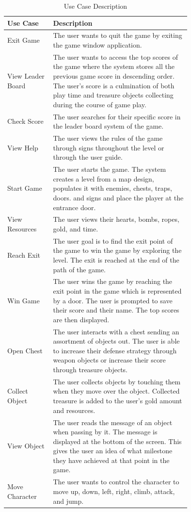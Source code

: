 \documentclass[12pt, titlepage]{article}
\begin{document}
\begin{longtable}{|l|p{0.75\linewidth}|}
\caption{Use Case Description}\\
\hline
Use Case & Description\\
\hline
Exit Game & The user wants to quit the game by exiting the game window application.\\
\hline
View Leader Board & The user wants to access the top scores of the game where the system stores all the previous game score in descending order. The user's score is a culmination of both play time and treasure objects collecting during the course of game play.\\
\hline
Check Score & The user searches for their specific score in the leader board system of the game. \\
\hline
View Help & The user views the rules of the game through signs throughout the level or through the user guide.\\
\hline
Start Game & The user starts the game. The system creates a level from a map design, populates it with enemies, chests, traps, doors. and signs and place the player at the entrance door.\\
\hline
View Resources & The user views their hearts, bombs, ropes, gold, and time.\\
\hline
Reach Exit & The user goal is to find the exit point of the game to win the game by exploring the level. The exit is reached at the end of the path of the game.\\
\hline
Win Game & The user wins the game by reaching the exit point in the game which is represented by a door. The user is prompted to save their score and their name. The top scores are then displayed.\\
\hline
Open Chest & The user interacts with a chest sending an assortment of objects out. The user is able to increase their defense strategy through weapon objects or increase their score through treasure objects.\\
\hline
Collect Object & The user collects objects by touching them when they move over the object. Collected treasure is added to the user's gold amount and resources.\\
\hline
View Object & The user reads the message of an object when passing by it. The message is displayed at the bottom of the screen. This gives the user an idea of what milestone they have achieved at that point in the game.\\
\hline
Move Character & The user wants to control the character to move up, down, left, right, climb, attack, and jump.\\

\end{longtable}
\end{document}
